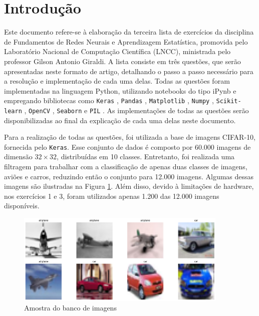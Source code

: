 \documentclass[]{abntex2}
\begin{document}
\frenchspacing 

\maketitle

\section*{\textbf{Introdução}}

Este documento refere-se à elaboração da terceira lista de exercícios da disciplina de Fundamentos de Redes Neurais e Aprendizagem Estatística, promovida pelo Laboratório Nacional de Computação Científica (LNCC), ministrada pelo professor Gilson Antonio Giraldi. A lista consiste em três questões, que serão apresentadas neste formato de artigo, detalhando o passo a passo necessário para a resolução e implementação de cada uma delas. Todas as questões foram implementadas na linguagem Python, utilizando notebooks do tipo iPynb e empregando bibliotecas como \texttt{Keras} \cite{keras}, \texttt{Pandas} \cite{pandas}, \texttt{Matplotlib} \cite{matplotlib}, \texttt{Numpy} \cite{numpy}, \texttt{Scikit-learn} \cite{scikit-learn}, \texttt{OpenCV} \cite{opencv}, \texttt{Seaborn} \cite{seaborn} e \texttt{PIL} \cite{pillow}. As implementações de todas as questões serão disponibilizadas ao final da explicação de cada uma delas neste documento.

Para a realização de todas as questões, foi utilizada a base de imagens CIFAR-10, fornecida pelo \texttt{Keras}. Esse conjunto de dados é composto por 60.000 imagens de dimensão $32\times32$, distribuídas em 10 classes. Entretanto, foi realizada uma filtragem para trabalhar com a classificação de apenas duas classes de imagens, aviões e carros, reduzindo então o conjunto para 12.000 imagens. Algumas dessas imagens são ilustradas na Figura \ref{fig:amostra}. Além disso, devido à limitações de hardware, nos exercícios 1 e 3, foram utilizados apenas 1.200 das 12.000 imagens disponíveis.

\begin{figure}[H]
    \centering 
    \includegraphics[width=0.9\textwidth]{imgs/introduction/amostra.png}
    \caption{Amostra do banco de imagens}
    \label{fig:amostra} %
\end{figure}
\end{document}

